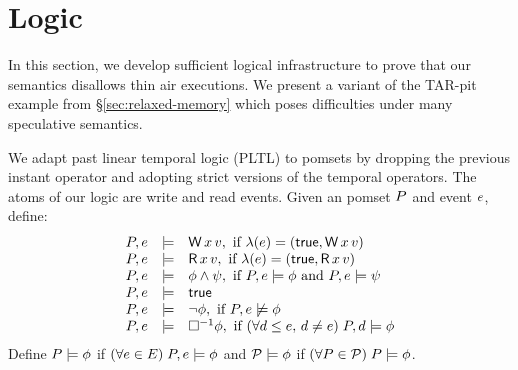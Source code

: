 \section{Logic}
\label{sec:logic}

\newcommand{\closed}{\textsf{closed}}
\newcommand{\pLTL}{\textsf{PLTL}}
\newcommand{\once}{\Diamond^{-1}}
\newcommand{\always}{\Box^{-1}}
\newcommand{\afo}{\phi}
\newcommand{\bfo}{\psi}
\newcommand{\mods}{\textsf{Models}}

In this section, we develop sufficient logical infrastructure to prove that
our semantics disallows thin air executions.  We present a variant of the
TAR-pit example from \S\ref{sec:relaxed-memory} which poses difficulties
under many speculative semantics.

We adapt past linear temporal logic (\pLTL)
\cite{Lichtenstein:1985:GP:648065.747612} to pomsets by dropping the previous
instant operator and adopting strict versions of the temporal operators.
The atoms of our logic are write and read events.
  Given an pomset $P$ and event $e$, define:
  \begin{displaymath}
    \begin{array}{lrl}
      \aPS,\aEv &\models& \DW{\aLoc}{\aVal}, \text{ if } \labelling(\aEv) =  (\TRUE, \DW{\aLoc}{\aVal}) \\
      \aPS,\aEv &\models& \DR{\aLoc}{\aVal}, \text{ if } \labelling(\aEv) =  (\TRUE, \DR{\aLoc}{\aVal}) \\
      \aPS,\aEv &\models& \afo\land\bfo, \text{ if } \aPS,\aEv \models  \afo \text{ and } \aPS,\aEv \models  \bfo \\
      \aPS,\aEv &\models& \TRUE\\
      \aPS,\aEv &\models& \lnot\afo, \text{ if } \aPS,\aEv \not\models \afo \\
      \aPS,\aEv &\models& \always\afo, \text{ if } (\forall \bEv \le \aEv,\,  \bEv\not=\aEv)\; \aPS,\bEv \models \afo
    \end{array} 
  \end{displaymath}
  Define $\aPS \models \afo$ if
  $(\forall \aEv \in \Event) \;\aPS,\aEv \models\afo$ and $\aPSS\models \afo$
  if $(\forall \aPS \in \aPSS)\; \aPS \models\afo$.

